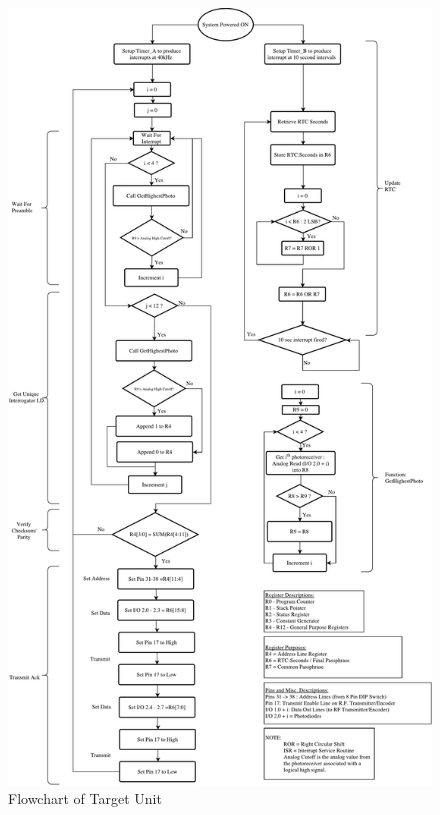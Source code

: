 \documentclass[letterpaper,10pt]{article}
\begin{document}
\begin{spacing}{1.15}
\begin{figure} [H]
	\centering
	\includegraphics[scale=0.400]{Friendly_Target_Software_Flowchart.pdf}
	\caption{Flowchart of Target Unit\label{fig:friendly-target-software-flowchart}}
\end{figure}


\end{spacing}
\end{document}
